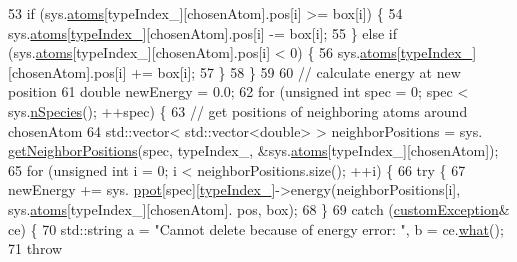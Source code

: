 \begin{DoxyCode}
53                 \textcolor{keywordflow}{if} (sys.\hyperlink{classsim_system_a90421b19082f7fb8fc23b7264b1161e4}{atoms}[typeIndex\_][chosenAtom].pos[i] >= box[i]) \{
54                                 sys.\hyperlink{classsim_system_a90421b19082f7fb8fc23b7264b1161e4}{atoms}[\hyperlink{classmc_move_acb731965547b0326ef318ec96da8b46a}{typeIndex\_}][chosenAtom].pos[i] -= box[i];
55                 \} \textcolor{keywordflow}{else} \textcolor{keywordflow}{if} (sys.\hyperlink{classsim_system_a90421b19082f7fb8fc23b7264b1161e4}{atoms}[typeIndex\_][chosenAtom].pos[i] < 0) \{
56                                 sys.\hyperlink{classsim_system_a90421b19082f7fb8fc23b7264b1161e4}{atoms}[\hyperlink{classmc_move_acb731965547b0326ef318ec96da8b46a}{typeIndex\_}][chosenAtom].pos[i] += box[i];
57                 \}
58     \}
59     
60     \textcolor{comment}{// calculate energy at new position}
61     \textcolor{keywordtype}{double} newEnergy = 0.0;
62     \textcolor{keywordflow}{for} (\textcolor{keywordtype}{unsigned} \textcolor{keywordtype}{int} spec = 0; spec < sys.\hyperlink{classsim_system_ab5e2e9b6204de15520302fe1d51688dd}{nSpecies}(); ++spec) \{
63         \textcolor{comment}{// get positions of neighboring atoms around chosenAtom}
64         std::vector< std::vector<double> > neighborPositions = sys.
      \hyperlink{classsim_system_a7ac49b2311cd8230df8d078a9d897b35}{getNeighborPositions}(spec, typeIndex\_, &sys.\hyperlink{classsim_system_a90421b19082f7fb8fc23b7264b1161e4}{atoms}[typeIndex\_][chosenAtom]);
65                 \textcolor{keywordflow}{for} (\textcolor{keywordtype}{unsigned} \textcolor{keywordtype}{int} i = 0; i < neighborPositions.size(); ++i) \{
66                                                 \textcolor{keywordflow}{try} \{
67                                                                 newEnergy += sys.
      \hyperlink{classsim_system_a8d6271751a62f61edcf57f773540a4a3}{ppot}[spec][\hyperlink{classmc_move_acb731965547b0326ef318ec96da8b46a}{typeIndex\_}]->energy(neighborPositions[i], sys.\hyperlink{classsim_system_a90421b19082f7fb8fc23b7264b1161e4}{atoms}[typeIndex\_][chosenAtom].
      pos, box);
68                                                 \}
69                                                 \textcolor{keywordflow}{catch} (\hyperlink{classcustom_exception}{customException}& ce) \{
70                                                                 std::string a = \textcolor{stringliteral}{"Cannot delete because of
       energy error: "}, b = ce.\hyperlink{classcustom_exception_aeb6ab5848b038adfc68fde86a512f691}{what}();
71                                                                 \textcolor{keywordflow}{throw} 

\end{DoxyCode}
